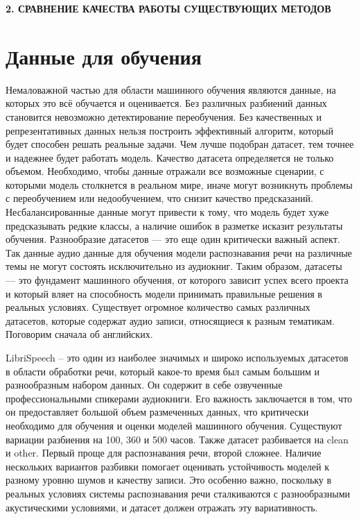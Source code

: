 \newpage
\begin{center}
  \textbf{\large 2. СРАВНЕНИЕ КАЧЕСТВА РАБОТЫ СУЩЕСТВУЮЩИХ МЕТОДОВ}
\end{center}

\section{Данные для обучения}

Немаловажной частью для области машинного обучения являются данные, на которых это всё обучается и оценивается.
Без различных разбиений данных становится невозможно детектирование переобучения.
Без качественных и репрезентативных данных нельзя построить эффективный алгоритм, который будет способен решать реальные задачи.
Чем лучше подобран датасет, тем точнее и надежнее будет работать модель.
Качество датасета определяется не только объемом.
Необходимо, чтобы данные отражали все возможные сценарии, с которыми модель столкнется в реальном мире, иначе могут возникнуть проблемы с переобучением или недообучением, что снизит качество предсказаний.
Несбалансированные данные могут привести к тому, что модель будет хуже предсказывать редкие классы, а наличие ошибок в разметке исказит результаты обучения.
Разнообразие датасетов — это еще один критически важный аспект.
Так данные аудио данные для обучения модели распознавания речи на различные темы не могут состоять исключительно из аудиокниг.
Таким образом, датасеты — это фундамент машинного обучения, от которого зависит успех всего проекта и который вляет на способность модели принимать правильные решения в реальных условиях.
Существует огромное количество самых различных датасетов, которые содержат аудио записи, относящиеся  к разным тематикам.
Поговорим сначала об английских.

LibriSpeech -- это один из наиболее значимых и широко используемых датасетов в области обработки речи, который какое-то время был самым большим и разнообразным набором данных.
Он содержит в себе озвученные профессиональными спикерами аудиокниги.
Его важность заключается в том, что он предоставляет большой объем размеченных данных, что критически необходимо для обучения и оценки моделей машинного обучения.
Существуют вариации разбиения на 100, 360 и 500 часов.
Также датасет разбивается на clean и other.
Первый проще для распознавания речи, второй сложнее.
Наличие нескольких вариантов разбивки помогает оценивать устойчивость моделей к разному уровню шумов и качеству записи.
Это особенно важно, поскольку в реальных условиях системы распознавания речи сталкиваются с разнообразными акустическими условиями, и датасет должен отражать эту вариативность.

